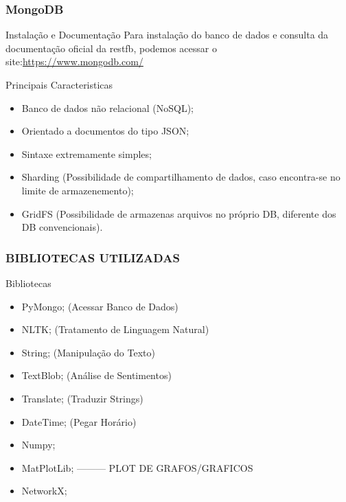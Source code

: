 \documentclass{beamer}
\begin{document}
\begin{frame}
	\frametitle{MongoDB}
	\begin{block}{Instala\c{c}\~ao e Documenta\c{c}\~ao}
		Para instala\c{c}\~ao do banco de dados e consulta da documenta\c{c}\~ao oficial da restfb, 
		podemos acessar o site:\href {https://www.mongodb.com/}{https://www.mongodb.com/}
	\end{block}
	\begin{block}{Principais Caracteristicas}
		\begin{itemize}
			\item Banco de dados n\~ao relacional (NoSQL);
			\item Orientado a documentos do tipo JSON;
			\item Sintaxe extremamente simples;
			\item Sharding (Possibilidade de compartilhamento de dados, caso encontra-se no limite de armazenemento);
			\item GridFS (Possibilidade de armazenas arquivos no pr\'oprio DB, diferente dos DB convencionais). 
		\end{itemize}
	\end{block}
\end{frame}

\begin{frame}
	\frametitle{BIBLIOTECAS UTILIZADAS}
	\begin{block}{Bibliotecas}
	\begin{itemize}
		\item PyMongo; (Acessar Banco de Dados)
		\item NLTK; (Tratamento de Linguagem Natural)
		\item String; (Manipula\c{c}\~ao do Texto)
		\item TextBlob; (An\'alise de Sentimentos)
		\item Translate; (Traduzir Strings)
		\item DateTime; (Pegar Hor\'ario)
		\item Numpy; 
		\item MatPlotLib; --------- PLOT DE GRAFOS/GRAFICOS
		\item NetworkX;
				\end{itemize}

	\end{block}
	
\end{frame}
\end{document}
